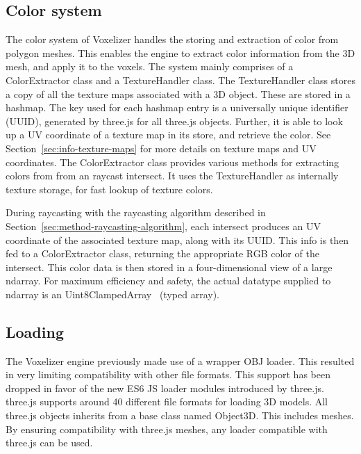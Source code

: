 \subsection{Color system}
The color system of Voxelizer handles the storing and extraction of color from polygon meshes. This enables the engine to extract color information from the 3D mesh, and apply it to the voxels. The system mainly comprises of a ColorExtractor class and a TextureHandler class. The TextureHandler class stores a copy of all the texture maps associated with a 3D object. These are stored in a hashmap. The key used for each hashmap entry is a universally unique identifier (UUID), generated by three.js for all three.js objects. Further, it is able to look up a UV coordinate of a texture map in its store, and retrieve the color. See Section~\ref{sec:info-texture-maps} for more details on texture maps and UV coordinates. The ColorExtractor class provides various methods for extracting colors from from an raycast intersect. It uses the TextureHandler as internally texture storage, for fast lookup of texture colors. 

During raycasting with the raycasting algorithm described in Section~\ref{sec:method-raycasting-algorithm}, each intersect produces an UV coordinate of the associated texture map, along with its UUID. This info is then fed to a ColorExtractor class, returning the appropriate RGB color of the intersect. This color data is then stored in a four-dimensional view of a large ndarray. For maximum efficiency and safety, the actual datatype supplied to ndarray is an Uint8ClampedArray~\cite{uint8clampedarray} (typed array).

\subsection{Loading}
The Voxelizer engine previously made use of a wrapper OBJ loader. This resulted in very limiting compatibility with other file formats. This support has been dropped in favor of the new ES6 JS loader modules introduced by three.js. three.js supports around 40 different file formats for loading 3D models. All three.js objects inherits from a base class named Object3D. This includes meshes. By ensuring compatibility with three.js meshes, any loader compatible with three.js can be used.

